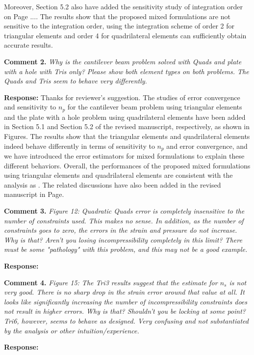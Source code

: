 \documentclass{article}
\begin{document}
Moreover, Section 5.2 also have added the sensitivity study of integration order on Page ....
The results show that the proposed mixed formulations are not sensitive to the integration order, using the integration scheme of order 2 for triangular elements and order 4 for quadrilateral elements can sufficiently obtain accurate results.


\textbf{Comment 2.} \textit{Why is the cantilever beam problem solved with Quads and plate with a hole with Tris only? Please show both element types on both problems. The Quads and Tris seem to behave very differently.}

\textbf{Response:}
Thanks for reviewer's suggestion. The studies of error convergence and sensitivity to $n_p$ for the cantilever beam problem using triangular elements and the plate with a hole problem using quadrilateral elements have been added in Section 5.1 and Section 5.2 of the revised manuscript, respectively, as shown in Figures.
The results show that the triangular elements and quadrilateral elements indeed behave differently in terms of sensitivity to $n_p$ and error convergence,
and we have introduced the error estimators for mixed formulations to explain these different behaviors.
Overall, the performances of the proposed mixed formulations using triangular elements and quadrilateral elements are consistent with the analysis as .
The related discussions have also been added in the revised manuscript in Page.


\textbf{Comment 3.} \textit{Figure 12: Quadratic Quads error is completely insensitive to the number of constraints used. This makes no sense. In addition, as the number of constraints goes to zero, the errors in the strain and pressure do not increase. Why is that? Aren't you losing incompressibility completely in this limit? There must be some "pathology" with this problem, and this may not be a good example.}

\textbf{Response:} 

\textbf{Comment 4.} \textit{
Figure 15:
The Tri3 results suggest that the estimate for $n_s$ is not very good. There is no sharp drop in the strain error around that value at all.
It looks like significantly increasing the number of incompressibility constraints does not result in higher errors.
Why is that? Shouldn't you be locking at some point? Tri6, however, seems to behave as designed. Very confusing and not substantiated by the analysis or other intuition/experience.
}

\textbf{Response:}
\end{document}
